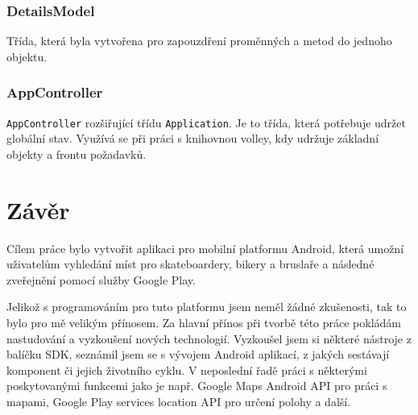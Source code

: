 \documentclass[12pt]{article}
\begin{document}
\subsubsection{DetailsModel}
Třída, která byla vytvořena pro zapouzdření proměnných a metod do jednoho objektu.
\subsubsection{AppController}
\verb+AppController+ rozšiřující třídu \verb+Application+. Je to třída, která potřebuje udržet globální stav. Využívá se při práci s knihovnou volley, kdy udržuje základní objekty a frontu požadavků. 
\cite{volley-singleton}
\newpage
\section{Závěr}
Cílem práce bylo vytvořit aplikaci pro mobilní platformu Android, která umožní uživatelům vyhledání míst pro skateboardery, bikery a bruslaře a následné zveřejnění pomocí služby Google Play.

Jelikož s programováním pro tuto platformu jsem neměl žádné zkušenosti, tak to bylo pro mě velikým přínosem. Za hlavní přínos při tvorbě této práce pokládám nastudování a vyzkoušení nových technologií. Vyzkoušel jsem si některé nástroje z balíčku SDK, seznámil jsem se s vývojem Android aplikací, z jakých sestávají komponent či jejich životního cyklu. V neposlední řadě práci s některými poskytovanými funkcemi jako je např. Google Maps Android API pro práci s mapami, Google Play services location API pro určení polohy a další.
\end{document}
